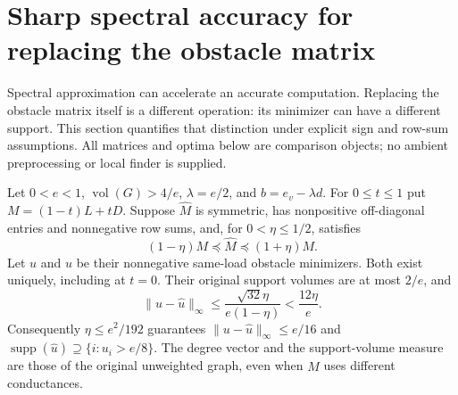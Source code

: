 \section{Sharp spectral accuracy for replacing the obstacle matrix}
\label{sec:op3-spectral-envelope-stability}

Spectral approximation can accelerate an accurate computation. Replacing
the obstacle matrix itself is a different operation: its minimizer can
have a different support. This section quantifies that distinction under
explicit sign and row-sum assumptions. All matrices and optima below are
comparison objects; no ambient preprocessing or local finder is supplied.

\begin{theorem}
\label{thm:op3-spectral-envelope-stability}
Let $0<e<1$, $\operatorname{vol}(G)>4/e$, $\lambda=e/2$, and
$b=e_v-\lambda d$. For $0\leq t\leq1$ put $M=(1-t)L+tD$.
Suppose $\widehat M$ is symmetric, has nonpositive off-diagonal entries
and nonnegative row sums, and, for $0<\eta\leq1/2$, satisfies
\[
 (1-\eta)M\preceq\widehat M\preceq(1+\eta)M.
\]
Let $u$ and $\widehat u$ be their nonnegative same-load obstacle minimizers.
Both exist uniquely, including at $t=0$. Their original support volumes
are at most $2/e$, and
\[
 \|u-\widehat u\|_\infty
 \leq\frac{\sqrt{32}\eta}{e(1-\eta)}<\frac{12\eta}{e}.
\]
Consequently $\eta\leq e^2/192$ guarantees
$\|u-\widehat u\|_\infty\leq e/16$ and
$\operatorname{supp}(\widehat u)\supseteq\{i:u_i>e/8\}$.
The degree vector and the support-volume measure are those of the original
unweighted graph, even when $\widehat M$ uses different conductances.
\end{theorem}
